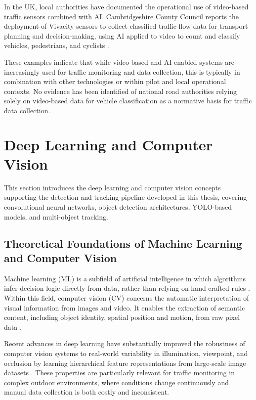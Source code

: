 In the UK, local authorities have documented the operational use of video-based traffic sensors combined with AI. Cambridgeshire County Council reports the deployment of Vivacity sensors to collect classified traffic flow data for transport planning and decision-making, using AI applied to video to count and classify vehicles, pedestrians, and cyclists \citep{VivacityValidation2022}. 

These examples indicate that while video-based and AI-enabled systems are increasingly used for traffic monitoring and data collection, this is typically in combination with other technologies or within pilot and local operational contexts. No evidence has been identified of national road authorities relying solely on video-based data for vehicle classification as a normative basis for traffic data collection.

\section{Deep Learning and Computer Vision}
\label{sec:computer_vision}
This section introduces the deep learning and computer vision concepts supporting the detection and tracking pipeline developed in this thesis, covering convolutional neural networks, object detection architectures, YOLO-based models, and multi-object tracking.

\subsection{Theoretical Foundations of Machine Learning and Computer Vision}
\label{sec:ml_cv}
Machine learning (ML) is a subfield of artificial intelligence in which algorithms infer decision logic directly from data, rather than relying on hand-crafted rules \citep{Goodfellow-et-al-2016}. Within this field, computer vision (CV) concerns the automatic interpretation of visual information from images and video. It enables the extraction of semantic content, including object identity, spatial position and motion, from raw pixel data \citep{Szeliski2010}.

Recent advances in deep learning have substantially improved the robustness of computer vision systems to real-world variability in illumination, viewpoint, and occlusion by learning hierarchical feature representations from large-scale image datasets \citep{LeCun2015}. These properties are particularly relevant for traffic monitoring in complex outdoor environments, where conditions change continuously and manual data collection is both costly and inconsistent.

